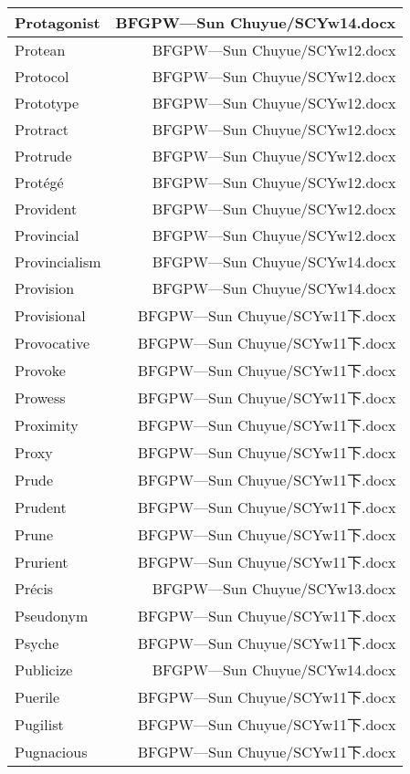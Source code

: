 \documentclass{article}
\begin{document}
\begin{center}
\begin{longtable}{|l|r|}
Protagonist  &  BFGPW---Sun Chuyue/SCYw14.docx\\  
\hline
Protean  &  BFGPW---Sun Chuyue/SCYw12.docx\\  
\hline
Protocol  &  BFGPW---Sun Chuyue/SCYw12.docx\\  
\hline
Prototype  &  BFGPW---Sun Chuyue/SCYw12.docx\\  
\hline
Protract  &  BFGPW---Sun Chuyue/SCYw12.docx\\  
\hline
Protrude  &  BFGPW---Sun Chuyue/SCYw12.docx\\  
\hline
Protégé  &  BFGPW---Sun Chuyue/SCYw12.docx\\  
\hline
Provident  &  BFGPW---Sun Chuyue/SCYw12.docx\\  
\hline
Provincial  &  BFGPW---Sun Chuyue/SCYw12.docx\\  
\hline
Provincialism  &  BFGPW---Sun Chuyue/SCYw14.docx\\  
\hline
Provision  &  BFGPW---Sun Chuyue/SCYw14.docx\\  
\hline
Provisional  &  BFGPW---Sun Chuyue/SCYw11下.docx\\  
\hline
Provocative  &  BFGPW---Sun Chuyue/SCYw11下.docx\\  
\hline
Provoke  &  BFGPW---Sun Chuyue/SCYw11下.docx\\  
\hline
Prowess  &  BFGPW---Sun Chuyue/SCYw11下.docx\\  
\hline
Proximity  &  BFGPW---Sun Chuyue/SCYw11下.docx\\  
\hline
Proxy  &  BFGPW---Sun Chuyue/SCYw11下.docx\\  
\hline
Prude  &  BFGPW---Sun Chuyue/SCYw11下.docx\\  
\hline
Prudent  &  BFGPW---Sun Chuyue/SCYw11下.docx\\  
\hline
Prune  &  BFGPW---Sun Chuyue/SCYw11下.docx\\  
\hline
Prurient  &  BFGPW---Sun Chuyue/SCYw11下.docx\\  
\hline
Précis  &  BFGPW---Sun Chuyue/SCYw13.docx\\  
\hline
Pseudonym  &  BFGPW---Sun Chuyue/SCYw11下.docx\\  
\hline
Psyche  &  BFGPW---Sun Chuyue/SCYw11下.docx\\  
\hline
Publicize  &  BFGPW---Sun Chuyue/SCYw14.docx\\  
\hline
Puerile  &  BFGPW---Sun Chuyue/SCYw11下.docx\\  
\hline
Pugilist  &  BFGPW---Sun Chuyue/SCYw11下.docx\\  
\hline
Pugnacious  &  BFGPW---Sun Chuyue/SCYw11下.docx\\  

\end{longtable}
\end{center}
\end{document}
